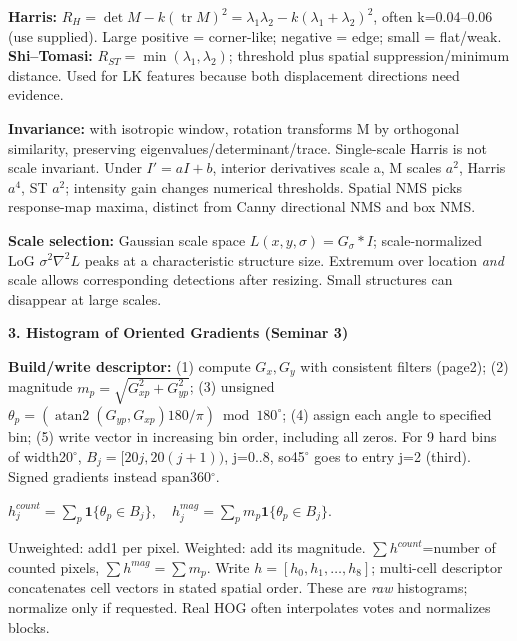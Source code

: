 \documentclass[a4paper]{article}
\newcommand{\key}[1]{\textbf{#1}}
\newcommand{\Topic}[1]{\par\vspace{1.7pt}\noindent
  {\fontsize{7.7}{8.0}\selectfont\bfseries #1}\par\vspace{0.3pt}}
\newcommand{\eq}[1]{\par\noindent\mbox{\(\displaystyle #1\)}\par}
\newcommand{\tr}{\operatorname{tr}}
\newcounter{sheet}
\newcounter{sheetcolumn}
\newlength{\colwidth}
\newenvironment{sheetcol}[1][7.0]{\stepcounter{sheetcolumn}
  \begin{lrbox}{\columnbox}\begin{minipage}[t]{\colwidth}\vspace{0pt}
  \fontsize{#1}{\dimexpr#1pt+0.6pt\relax}\selectfont}
  {\end{minipage}\end{lrbox}
  \typeout{CV1COL|\thesheet|\thesheetcolumn|\the\dimexpr\ht\columnbox+\dp\columnbox\relax}
  \usebox{\columnbox}\ignorespacesafterend}
\begin{document}
\begin{sheetcol}[6.6]
\key{Harris:} \(R_H=\det M-k(\tr M)^2=\lambda_1\lambda_2-k(\lambda_1+\lambda_2)^2\), often k=0.04--0.06 (use supplied). Large positive = corner-like; negative = edge; small = flat/weak. \key{Shi--Tomasi:} \(R_{ST}=\min(\lambda_1,\lambda_2)\); threshold plus spatial suppression/minimum distance. Used for LK features because both displacement directions need evidence.

\key{Invariance:} with isotropic window, rotation transforms M by orthogonal similarity, preserving eigenvalues/determinant/trace. Single-scale Harris is not scale invariant. Under \(I'=aI+b\), interior derivatives scale a, M scales \(a^2\), Harris \(a^4\), ST \(a^2\); intensity gain changes numerical thresholds. Spatial NMS picks response-map maxima, distinct from Canny directional NMS and box NMS.

\key{Scale selection:} Gaussian scale space \(L(x,y,\sigma)=G_\sigma*I\); scale-normalized LoG \(\sigma^2\nabla^2L\) peaks at a characteristic structure size. Extremum over location \emph{and} scale allows corresponding detections after resizing. Small structures can disappear at large scales.

\Topic{3. Histogram of Oriented Gradients (Seminar 3)}
\key{Build/write descriptor:} (1) compute \(G_x,G_y\) with consistent filters (page2); (2) magnitude \(m_p=\sqrt{G_{xp}^2+G_{yp}^2}\); (3) unsigned \(\theta_p=(\operatorname{atan2}(G_{yp},G_{xp})180/\pi)\bmod180^\circ\); (4) assign each angle to specified bin; (5) write vector in increasing bin order, including all zeros. For 9 hard bins of width20\(^{\circ}\), \(B_j=[20j,20(j+1))\), j=0..8, so45\(^{\circ}\) goes to entry j=2 (third). Signed gradients instead span360\(^{\circ}\).
\eq{h_j^{count}=\sum_p\mathbf1\{\theta_p\in B_j\},\quad
h_j^{mag}=\sum_p m_p\mathbf1\{\theta_p\in B_j\}.}
Unweighted: add1 per pixel. Weighted: add its magnitude. \(\sum h^{count}\)=number of counted pixels, \(\sum h^{mag}=\sum m_p\). Write \(h=[h_0,h_1,\ldots,h_8]\); multi-cell descriptor concatenates cell vectors in stated spatial order. These are \emph{raw} histograms; normalize only if requested. Real HOG often interpolates votes and normalizes blocks.


\end{sheetcol}
\end{document}
